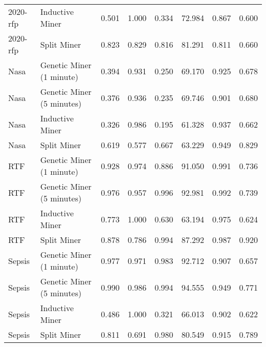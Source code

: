 \begin{tabular}{llrrrrrr}
2020-rfp & Inductive Miner & 0.501 & 1.000 & 0.334 & 72.984 & 0.867 & 0.600 \\
2020-rfp & Split Miner & 0.823 & 0.829 & 0.816 & 81.291 & 0.811 & 0.660 \\
Nasa & Genetic Miner (1 minute) & 0.394 & 0.931 & 0.250 & 69.170 & 0.925 & 0.678 \\
Nasa & Genetic Miner (5 minutes) & 0.376 & 0.936 & 0.235 & 69.746 & 0.901 & 0.680 \\
Nasa & Inductive Miner & 0.326 & 0.986 & 0.195 & 61.328 & 0.937 & 0.662 \\
Nasa & Split Miner & 0.619 & 0.577 & 0.667 & 63.229 & 0.949 & 0.829 \\
RTF & Genetic Miner (1 minute) & 0.928 & 0.974 & 0.886 & 91.050 & 0.991 & 0.736 \\
RTF & Genetic Miner (5 minutes) & 0.976 & 0.957 & 0.996 & 92.981 & 0.992 & 0.739 \\
RTF & Inductive Miner & 0.773 & 1.000 & 0.630 & 63.194 & 0.975 & 0.624 \\
RTF & Split Miner & 0.878 & 0.786 & 0.994 & 87.292 & 0.987 & 0.920 \\
Sepsis & Genetic Miner (1 minute) & 0.977 & 0.971 & 0.983 & 92.712 & 0.907 & 0.657 \\
Sepsis & Genetic Miner (5 minutes) & 0.990 & 0.986 & 0.994 & 94.555 & 0.949 & 0.771 \\
Sepsis & Inductive Miner & 0.486 & 1.000 & 0.321 & 66.013 & 0.902 & 0.622 \\
Sepsis & Split Miner & 0.811 & 0.691 & 0.980 & 80.549 & 0.915 & 0.789 \\
\bottomrule
\end{tabular}
